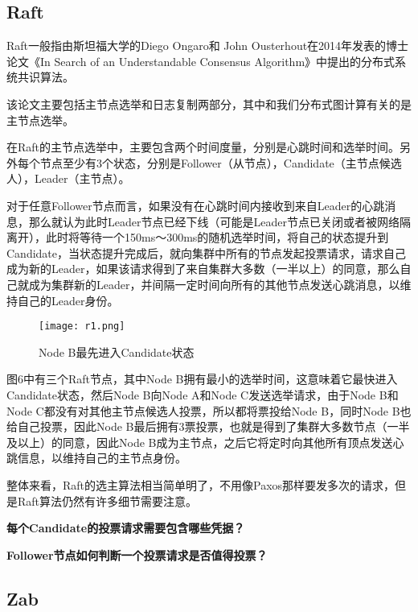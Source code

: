 \documentclass{article}
\begin{document}
\subsection{Raft}

Raft一般指由斯坦福大学的Diego Ongaro和 John Ousterhout在2014年发表的博士论文《In Search of an Understandable Consensus Algorithm》中提出的分布式系统共识算法。

该论文主要包括主节点选举和日志复制两部分，其中和我们分布式图计算有关的是主节点选举。

在Raft的主节点选举中，主要包含两个时间度量，分别是心跳时间和选举时间。另外每个节点至少有3个状态，分别是Follower（从节点），Candidate（主节点候选人），Leader（主节点）。

对于任意Follower节点而言，如果没有在心跳时间内接收到来自Leader的心跳消息，那么就认为此时Leader节点已经下线（可能是Leader节点已关闭或者被网络隔离开），此时将等待一个150ms～300ms的随机选举时间，将自己的状态提升到Candidate，当状态提升完成后，就向集群中所有的节点发起投票请求，请求自己成为新的Leader，如果该请求得到了来自集群大多数（一半以上）的同意，那么自己就成为集群新的Leader，并间隔一定时间向所有的其他节点发送心跳消息，以维持自己的Leader身份。


\begin{figure}[h]
	\centering
	\texttt{[image: r1.png]}
	\caption{Node B最先进入Candidate状态}
	\label{fig:label}
\end{figure}

图6中有三个Raft节点，其中Node B拥有最小的选举时间，这意味着它最快进入Candidate状态，然后Node B向Node A和Node C发送选举请求，由于Node B和Node C都没有对其他主节点候选人投票，所以都将票投给Node B，同时Node B也给自己投票，因此Node B最后拥有3票投票，也就是得到了集群大多数节点（一半及以上）的同意，因此Node B成为主节点，之后它将定时向其他所有顶点发送心跳信息，以维持自己的主节点身份。

整体来看，Raft的选主算法相当简单明了，不用像Paxos那样要发多次的请求，但是Raft算法仍然有许多细节需要注意。

\textbf{每个Candidate的投票请求需要包含哪些凭据？}

\textbf{Follower节点如何判断一个投票请求是否值得投票？}



\subsection{Zab}





\end{document}
